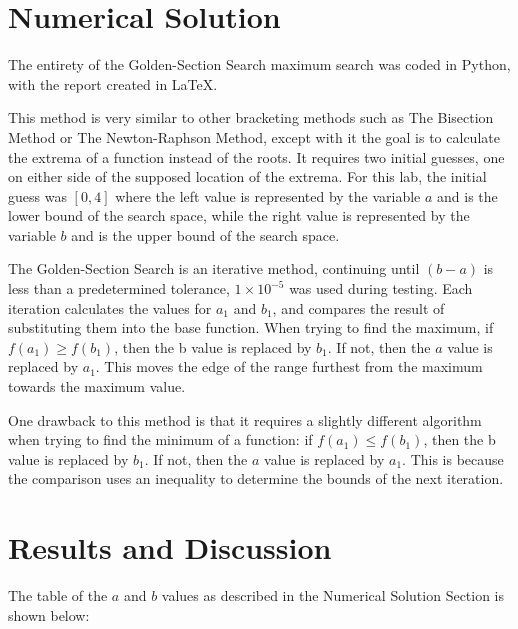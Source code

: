 \documentclass[12pt, letterpaper]{article}
\begin{document}
	 
\section{\label{solution}Numerical Solution}
	The entirety of the Golden-Section Search maximum search was coded in Python, with the report created in \LaTeX{}.
	
	This method is very similar to other bracketing methods such as The Bisection Method or The Newton-Raphson Method, except with it the goal is to calculate the extrema of a function instead of the roots. It requires two initial guesses, one on either side of the supposed location of the extrema. For this lab, the initial guess was $[0, 4]$ where the left value is represented by the variable $a$ and is the lower bound of the search space, while the right value is represented by the variable $b$ and is the upper bound of the search space.
	
	The Golden-Section Search is an iterative method, continuing until $(b-a)$ is less than a predetermined tolerance, $1\times10^{-5}$ was used during testing. Each iteration calculates the values for $a_1$ and $b_1$, and compares the result of substituting them into the base function. When trying to find the maximum, if $f(a_1)\geq f(b_1)$, then the b value is replaced by $b_1$. If not, then the $a$ value is replaced by $a_1$. This moves the edge of the range furthest from the maximum towards the maximum value.
	
	One drawback to this method is that it requires a slightly different algorithm when trying to find the minimum of a function: if $f(a_1)\leq f(b_1)$, then the b value is replaced by $b_1$. If not, then the $a$ value is replaced by $a_1$. This is because the comparison uses an inequality to determine the bounds of the next iteration.

\newpage
\section{\label{sec:results}Results and Discussion}
    	The table of the $a$ and $b$ values as described in the Numerical Solution Section is shown below:
	
\end{document}
